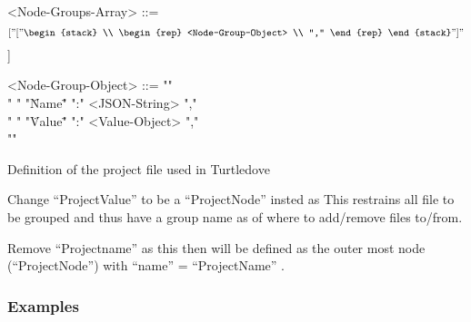 \begin{nonfloatingfigure}
\begin{grammar}
<Node-Groups-Array> ::= \[[
    "["
    \begin{stack}
      \\
      \begin{rep}
        <Node-Group-Object> \\
        ","
      \end{rep}
    \end{stack}
    "]"
    \]]

<Node-Group-Object> ::= "{" \\
  "  " "\"Name\"" ":" <JSON-String> "," \\
  "  " "\"Value\"" ":" <Value-Object> "," \\
  "}"
\end{grammar}


\caption{Definition of the project file used in Turtledove}
\label{fig:protocol-project-file}
\end{nonfloatingfigure}

Change ``ProjectValue'' to be a ``ProjectNode'' insted as This restrains all
file to be grouped and thus have a group name as of where to add/remove files
to/from.

Remove ``Projectname'' as this then will be defined as the outer most node
(``ProjectNode'') with ``name'' = ``ProjectName'' .


\subsubsection{Examples}

